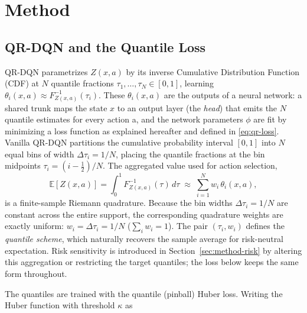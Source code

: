 \documentclass{ieeetmlcn}
\begin{document}
\section{Method}
\label{sec:method}

\subsection{QR-DQN and the Quantile Loss}
QR-DQN parametrizes $Z(x,a)$ by its inverse Cumulative Distribution Function (CDF) at $N$ quantile fractions
$\tau_1,\dots,\tau_N\in[0,1]$, learning
$\theta_i(x,a)\approx F^{-1}_{Z(x,a)}(\tau_i)$.
These $\theta_i(x,a)$ are the
outputs of a neural network: a shared trunk maps the state $x$ to an output
layer (the \emph{head}) that emits the $N$ quantile estimates for every action
a, and the network parameters $\phi$ are fit by
minimizing a loss function as explained hereafter and defined in \eqref{eq:qr-loss}.
Vanilla QR-DQN partitions the cumulative probability interval $[0,1]$ into $N$ equal bins of width $\Delta \tau_i = 1/N$, placing the quantile fractions at the bin midpoints $\tau_i=(i-\tfrac12)/N$. The aggregated value used for action selection,
\begin{equation}
\mathbb{E}[Z(x,a)] = \int_0^1 F^{-1}_{Z(x,a)}(\tau)\,d\tau
\;\approx\; \sum_{i=1}^{N} w_i\,\theta_i(x,a),
\label{eq:expectation}
\end{equation}
is a finite-sample Riemann quadrature. Because the bin widths $\Delta \tau_i = 1/N$ are constant across the entire support, the corresponding quadrature weights are exactly uniform: $w_i = \Delta \tau_i = 1/N$ ($\sum_i w_i = 1$). The pair $(\tau_i,w_i)$ defines the \emph{quantile scheme}, which naturally recovers the sample average for risk-neutral expectation. Risk sensitivity is introduced in Section~\ref{sec:method-risk} by altering this aggregation or restricting the target quantiles; the loss below keeps the same form throughout.

The quantiles are trained with the quantile (pinball) Huber loss. Writing the
Huber function with threshold $\kappa$ as
\end{document}
